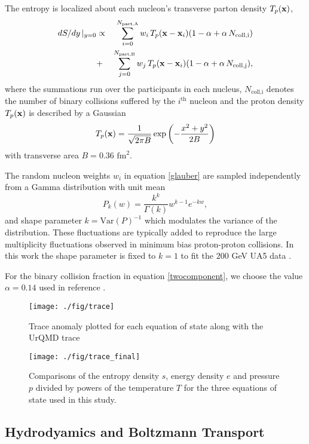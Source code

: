 \documentclass[aps,prc,reprint,amsmath,nofootinbib,superscriptaddress]{revtex4-1}
\begin{document}
The entropy is localized about each nucleon's transverse parton density $T_p({\bf x})$,
\begin{eqnarray}
 dS/dy \,\vert_{y=0} &\propto& \sum\limits_{i=0}^{N_\text{part,A}} w_i\, T_p({\bf x} - {\bf x}_i)(1-\alpha + \alpha\, N_\text{coll,i}) \nonumber \\
                     &+& \sum\limits_{j=0}^{N_\text{part,B}} w_j\, T_p({\bf x} - {\bf x}_i)(1-\alpha + \alpha\, N_\text{coll,j}),
 \label{glauber}
\end{eqnarray}
where the summations run over the participants in each nucleus, $N_\text{coll,i}$ denotes the number of binary collisions suffered by the $i^\text{th}$ 
nucleon and the proton density $T_p({\bf x})$ is described by a Gaussian
\begin{equation}
 T_p({\bf x}) = \frac{1}{\sqrt{2 \pi B}} \exp \left(-\frac{x^2+y^2}{2 B} \right)
\end{equation}
with transverse area $B = 0.36$ $\text{fm}^2$.

The random nucleon weights $w_i$ in equation \eqref{glauber} are sampled independently from a Gamma distribution with unit mean
\begin{equation}
 P_k(w) = \frac{k^k}{\Gamma(k)} w^{k-1} e^{-k w},
\end{equation}
and shape parameter $k = \text{Var}(P)^{-1}$ which modulates the variance of the distribution. These fluctuations are typically added \cite{?} to reproduce 
the large multiplicity fluctuations observed in minimum bias proton-proton collisions. In this work the shape parameter is fixed to $k=1$ to fit the $200$ 
GeV UA5 data \cite{?}. 

For the binary collision fraction in equation \eqref{twocomponent}, we choose the value $\alpha=0.14$ used in reference \cite{?}.
\begin{figure}[t]
  \texttt{[image: ./fig/trace]}
  \caption{\label{fig:eos} Trace anomaly plotted for each equation of state along with the UrQMD trace}
\end{figure}

\begin{figure}[b]
  \texttt{[image: ./fig/trace\_final]}
  \caption{\label{fig:eos} Comparisons of the entropy density $s$, energy density $e$ and pressure $p$ divided by powers of the temperature $T$ for the 
	   three equations of state used in this study.}
\end{figure}

\subsection{Hydrodyamics and Boltzmann Transport}
\end{document}
